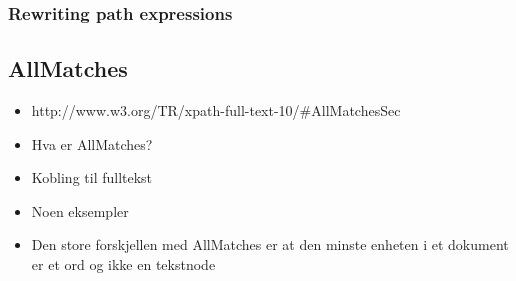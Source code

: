 \subsubsection{Rewriting path expressions}

\subsection{AllMatches}
\label{sect:theory:xquery:allmatches}
\begin{itemize}
  \item http://www.w3.org/TR/xpath-full-text-10/\#AllMatchesSec
  \item Hva er AllMatches?
  \item Kobling til fulltekst
  \item Noen eksempler
  \item Den store forskjellen med AllMatches er at den minste enheten i et 
        dokument er et ord og ikke en tekstnode
\end{itemize}
